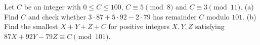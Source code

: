 Let $C$ be an integer with $0\le C\le100$, $C\equiv5\pmod8$ and $C\equiv3\pmod{11}$. (a) Find $C$ and check whether $3\cdot87+5\cdot92-2\cdot79$ has remainder $C$ modulo $101$. (b) Find the smallest $X+Y+Z+C$ for positive integers $X,Y,Z$ satisfying $87X+92Y-79Z\equiv C\pmod{101}$.
